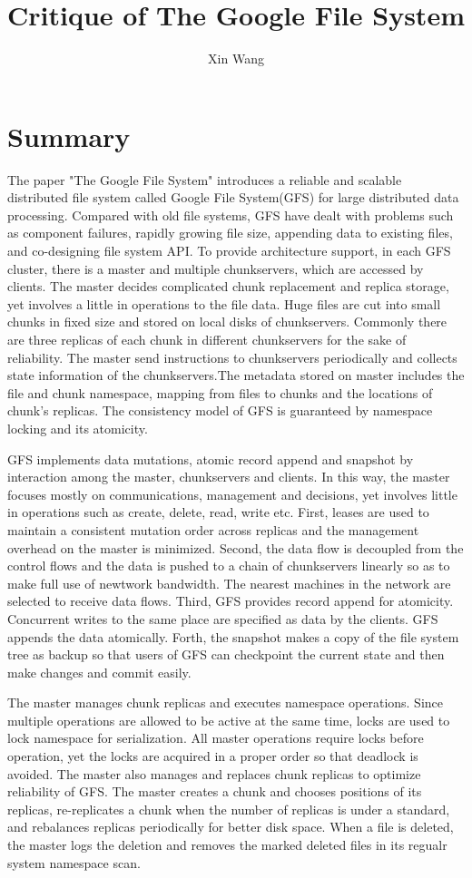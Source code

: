 \documentclass[10pt, letterpaper]{article}
\title{Critique of The Google File System}
\author{Xin Wang}
\date{} %
\begin{document}
\maketitle

\section{Summary}
The paper "The Google File System"\cite{ghemawat2003google} introduces a reliable and scalable distributed file system
called Google File System(GFS) for large distributed data processing. Compared with old file
systems, GFS have dealt with
problems such as component failures, rapidly growing file size, appending data to existing files, and co-designing file
system API. To provide architecture support, in each GFS cluster, there is a master and multiple chunkservers, which are accessed by
clients. The master decides complicated chunk replacement and replica storage, yet involves a little in
operations to the file data. Huge files are cut into small chunks in fixed size and stored on local disks of chunkservers. 
Commonly there are three replicas of each chunk in different chunkservers for the sake of reliability. The
master send instructions to chunkservers periodically and collects state information of the chunkservers.The metadata stored on master
includes the file and chunk namespace, mapping from files to chunks and the locations of chunk's
replicas. The consistency model of GFS is guaranteed by namespace locking and its atomicity. 

GFS implements data mutations, atomic record append and snapshot by interaction among the master, chunkservers
and clients. In this way, the master focuses mostly on communications, management and decisions, yet involves little in
operations such as create, delete, read, write etc. First, leases are used to maintain a consistent mutation order
across replicas and the management overhead on the master is minimized. Second, the data flow is decoupled from the
control flows and the data is pushed to a chain of chunkservers linearly so as to make full use of newtwork
bandwidth. The nearest machines in the network are selected to receive data flows. Third, GFS provides record
append for atomicity. Concurrent writes to the same place are specified as data by the clients. GFS appends the
data atomically. Forth, the snapshot makes a copy of the file system tree as backup so that users of GFS can
checkpoint the current state and then make changes and commit easily.

The master manages chunk replicas and executes namespace operations. Since multiple operations are allowed to
be active at the same time, locks are used to lock namespace for serialization. All master operations require
locks before operation, yet the locks are acquired in a proper order so that deadlock is avoided. The master
also manages and replaces chunk replicas to optimize reliability of GFS. The master creates a chunk and chooses
positions of its replicas, re-replicates a chunk when the number of replicas is under a standard, and
rebalances replicas periodically for better disk space. When a file is deleted, the master logs the deletion
and removes the marked deleted files in its regualr system namespace scan.
\end{document}
